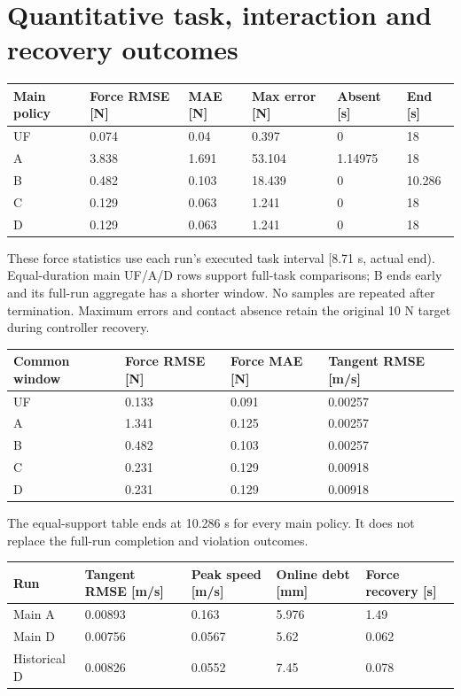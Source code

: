 \documentclass[10pt,letterpaper]{article}
\renewcommand{\arraystretch}{1.1}
\begin{document}
\clearpage
\section*{Quantitative task, interaction and recovery outcomes}
\begingroup
\small
\setlength{\tabcolsep}{4pt}
\renewcommand{\arraystretch}{1.16}
\begin{tabular}{@{}llllll@{}}
\toprule
\textbf{Main policy} & \textbf{Force RMSE [N]} & \textbf{MAE [N]} & \textbf{Max error [N]} & \textbf{Absent [s]} & \textbf{End [s]} \\
\midrule
UF & 0.074 & 0.04 & 0.397 & 0 & 18 \\
A & 3.838 & 1.691 & 53.104 & 1.14975 & 18 \\
B & 0.482 & 0.103 & 18.439 & 0 & 10.286 \\
C & 0.129 & 0.063 & 1.241 & 0 & 18 \\
D & 0.129 & 0.063 & 1.241 & 0 & 18 \\
\bottomrule
\end{tabular}
\endgroup


These force statistics use each run's executed task interval [8.71 s, actual end). Equal-duration main UF/A/D rows support full-task comparisons; B ends early and its full-run aggregate has a shorter window. No samples are repeated after termination. Maximum errors and contact absence retain the original 10 N target during controller recovery.


\begingroup
\small
\setlength{\tabcolsep}{4pt}
\renewcommand{\arraystretch}{1.16}
\begin{tabular}{@{}llll@{}}
\toprule
\textbf{Common window} & \textbf{Force RMSE [N]} & \textbf{Force MAE [N]} & \textbf{Tangent RMSE [m/s]} \\
\midrule
UF & 0.133 & 0.091 & 0.00257 \\
A & 1.341 & 0.125 & 0.00257 \\
B & 0.482 & 0.103 & 0.00257 \\
C & 0.231 & 0.129 & 0.00918 \\
D & 0.231 & 0.129 & 0.00918 \\
\bottomrule
\end{tabular}
\endgroup


The equal-support table ends at 10.286 s for every main policy. It does not replace the full-run completion and violation outcomes.


\begingroup
\small
\setlength{\tabcolsep}{4pt}
\renewcommand{\arraystretch}{1.16}
\begin{tabular}{@{}lllll@{}}
\toprule
\textbf{Run} & \textbf{Tangent RMSE [m/s]} & \textbf{Peak speed [m/s]} & \textbf{Online debt [mm]} & \textbf{Force recovery [s]} \\
\midrule
Main A & 0.00893 & 0.163 & 5.976 & 1.49 \\
Main D & 0.00756 & 0.0567 & 5.62 & 0.062 \\
Historical D & 0.00826 & 0.0552 & 7.45 & 0.078 \\
\bottomrule
\end{tabular}
\endgroup
\end{document}
